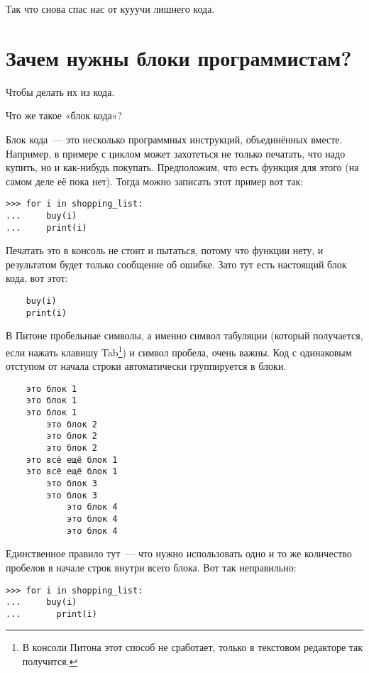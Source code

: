 Так что  снова спас нас от кууучи лишнего кода.

\section{Зачем нужны блоки программистам?}

Чтобы делать их из кода.

Что же такое «блок кода»?

Блок кода — это несколько программных инструкций, объединённых вместе. Например, в примере с циклом  может захотеться не только печатать, что надо купить, но и как-нибудь покупать. Предположим, что есть функция  для этого (на самом деле её пока нет). Тогда можно записать этот пример вот так:

\begin{verbatim}
>>> for i in shopping_list:
...     buy(i)
...     print(i)
\end{verbatim}

Печатать это в консоль не стоит и пытаться, потому что функции  нету, и результатом будет только сообщение об ошибке. Зато тут есть настоящий блок кода, вот этот:

\begin{verbatim}
    buy(i)
    print(i)
\end{verbatim}

В Питоне пробельные символы, а именно символ табуляции (который получается, если нажать клавишу Tab\footnote{В консоли Питона этот способ не сработает, только в текстовом редакторе так получится.}) и символ пробела, очень важны. Код с одинаковым отступом от начала строки автоматически группируется в блоки.

\begin{listing}
\begin{verbatim}
	это блок 1
	это блок 1
	это блок 1
	    это блок 2
	    это блок 2
	    это блок 2
	это всё ещё блок 1
	это всё ещё блок 1
	    это блок 3
	    это блок 3
	        это блок 4
	        это блок 4
	        это блок 4
\end{verbatim}
\end{listing}

Единственное правило тут — что нужно использовать одно и то же количество пробелов в начале строк внутри всего блока. Вот так неправильно:

\begin{verbatim}
>>> for i in shopping_list:
...     buy(i)
...       print(i)
\end{verbatim}

